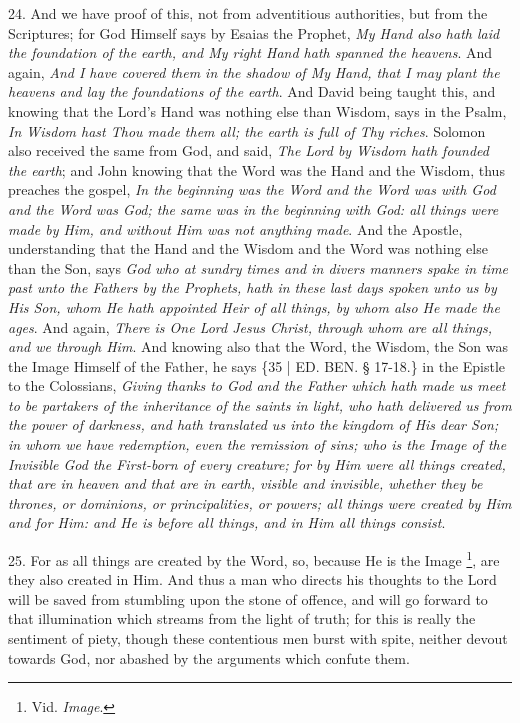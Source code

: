 24. And we have proof of this,
not from adventitious authorities, but from the Scriptures; for God
Himself says by Esaias the Prophet, \emph{My Hand also hath laid the
foundation of the earth, and My right Hand hath spanned the heavens}.
And again, \emph{And I have covered them in the shadow of My} \emph{Hand,
that I may plant the heavens and lay the foundations of the earth}.
And David being taught this, and knowing that the Lord's Hand was
nothing else than Wisdom, says in the Psalm, \emph{In Wisdom hast Thou
made them all; the earth is full of Thy riches}. Solomon also
received the same from God, and said, \emph{The Lord by Wisdom hath
founded the earth}; and John knowing that the Word was the Hand and
the Wisdom, thus preaches the gospel, \emph{In the beginning was the Word
and the Word was with God and the Word was God; the same was in the
beginning with God: all things were made by Him, and without Him was
not anything made}. And the Apostle, understanding that the Hand
and the Wisdom and the Word was nothing else than the Son, says \emph{God
who at sundry times and in divers manners spake in time past unto the
Fathers by the Prophets, hath in these last days spoken unto us by His
Son, whom He hath appointed Heir of all things, by whom also He made
the ages}. And again, \emph{There is One Lord Jesus Christ, through
whom are all things, and we through Him}. And knowing also that the
Word, the Wisdom, the Son was the Image Himself of the Father, he says
\{35 | ED.
BEN.
§ 17-18.\} in the Epistle to the Colossians, \emph{Giving thanks to God
and the Father which hath made us meet to be partakers of the
inheritance of the saints in light, who hath delivered us from the
power of darkness, and hath translated us into the kingdom of His dear
Son; in whom we have redemption, even the remission of sins; who is
the Image of the Invisible God the First-born of every creature; for
by Him were all things created, that are in heaven and that are in
earth, visible and invisible, whether they be thrones, or dominions,
or principalities, or powers; all things were created by Him and for
Him: and He is before all things, and in Him all things consist}.

25. For as all things are
created by the Word, so, because He is the Image \footnote{Vid. \emph{Image}.}, are they also created in Him. And thus a man who directs his
thoughts to the Lord will be saved from stumbling upon the stone of
offence, and will go forward to that illumination which streams from
the light of truth; for this is really the sentiment of piety, though
these contentious men burst with spite, neither devout towards God,
nor abashed by the arguments which confute them.


